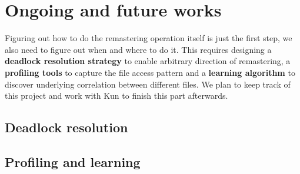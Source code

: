 \section{Ongoing and future works}
Figuring out how to do the remastering operation itself is just the first step, we also need to figure out when and where to do it. This requires designing a \textbf{deadlock resolution strategy} to enable arbitrary direction of remastering,  a \textbf{profiling tools} to capture the file access pattern and a \textbf{learning algorithm} to discover underlying correlation between different files. We plan to keep track of this project and work with Kun to finish this part afterwards.

\subsection{Deadlock resolution}

\subsection{Profiling and learning}

